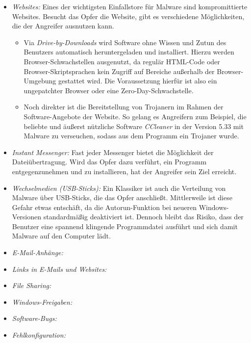 \begin{itemize}
	\item \textit{Websites:} Eines der wichtigsten Einfallstore für Malware sind kompromittierte Websites. Besucht das Opfer die Website, gibt es verschiedene Möglichkeiten, die der Angreifer ausnutzen kann.
	\begin{itemize}
		\item Via \textit{Drive-by-Downloads} wird Software ohne Wissen und Zutun des Benutzers automatisch heruntergeladen und installiert. Hierzu werden Browser-Schwachstellen ausgenutzt, da regulär HTML-Code oder Browser-Skriptsprachen kein Zugriff auf Bereiche außerhalb der Browser-Umgebung gestattet wird. Die Voraussetzung hierfür ist also ein ungepatchter Browser oder eine Zero-Day-Schwachstelle.
		\item Noch direkter ist die Bereitstellung von Trojanern im Rahmen der Software-Angebote der Website. So gelang es Angreifern zum Beispiel, die beliebte und äußerst nützliche Software \textit{CCleaner} in der Version 5.33 mit Malware zu verseuchen, sodass aus dem Programm ein Trojaner wurde.
	\end{itemize}
	\item \textit{Instant Messenger:} Fast jeder Messenger bietet die Möglichkeit der Dateiübertragung. Wird das Opfer dazu verführt, ein Programm entgegenzunehmen und zu installieren, hat der Angreifer sein Ziel erreicht.
	\item \textit{Wechselmedien (USB-Sticks):} Ein Klassiker ist auch die Verteilung von Malware über USB-Sticks, die das Opfer anschließt. Mittlerweile ist diese Gefahr etwas entschäft, da die Autorun-Funktion bei neueren Windows-Versionen standardmäßig deaktiviert ist. Dennoch bleibt das Risiko, dass der Benutzer eine spannend klingende Programmdatei ausführt und sich damit Malware auf den Computer lädt.
	\item \textit{E-Mail-Anhänge:}
	\item \textit{Links in E-Mails und Websites:}
	\item \textit{File Sharing:}
	\item \textit{Windows-Freigaben:}
	\item \textit{Software-Bugs:}
	\item \textit{Fehlkonfiguration:}
\end{itemize}

